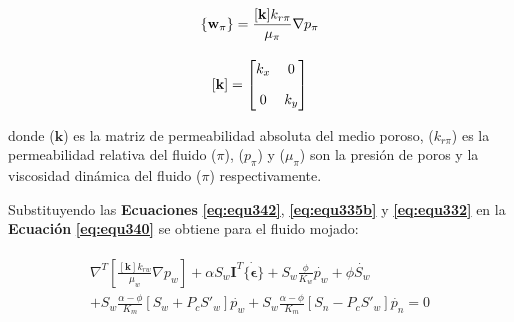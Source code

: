 \begin{ceqn} 
\begin{subequations} \label{eq:equ342} 
\begin{gather}
\normalsize{\{\mathbf{w}_{\pi}\} = \frac{[\mathbf{k}] k_{r\pi}}{\mu_{\pi}}\nabla p_{\pi}} \label{eq:equ342a}\\[10pt]
\normalsize{[\mathbf{k}]=\begin{bmatrix} 
k_{x} & 0\\[1em]
0 & k_{y}
\end{bmatrix} } \label{eq:equ342b}
\end{gather}  
\end{subequations} 
\end{ceqn}

donde ($\mathbf{k}$) es la matriz de permeabilidad absoluta del medio poroso, ($k_{r\pi}$) es la permeabilidad relativa del fluido ($\pi$), ($p_{\pi}$) y  ($\mu_{\pi}$) son la presión de poros y la viscosidad dinámica del fluido ($\pi$) respectivamente.\bigskip

Substituyendo las \textbf{Ecuaciones} \textbf{\ref{eq:equ342}}, \textbf{\ref{eq:equ335b}} y \textbf{\ref{eq:equ332}} en la \textbf{Ecuación} \textbf{\ref{eq:equ340}} se obtiene para el fluido mojado:\bigskip

\begin{ceqn} 
\begin{subequations} \label{eq:equ343} 
\begin{gather}
\begin{multlined}
\nabla^T \left[\frac{[\mathbf{k}] k_{rw}}{\mu_{w}}\nabla p_{w}\right]
+ \alpha S_{w}\mathbf{I}^T \dot{\{\mathbf{\epsilon}\}} + S_{w}\frac{\phi}{K_{w}}\dot{p_{w}} + \phi\dot{S_{w}}\\[10pt]
+ S_{w} \frac{\alpha - \phi}{K_m}\left[S_w + P_c S'_w\right]\dot{p_w} 
+ S_{w} \frac{\alpha - \phi}{K_m}\left[S_n - P_c S'_w\right]\dot{p_n} = 0
\end{multlined}
\end{gather}  
\end{subequations} 
\end{ceqn}

